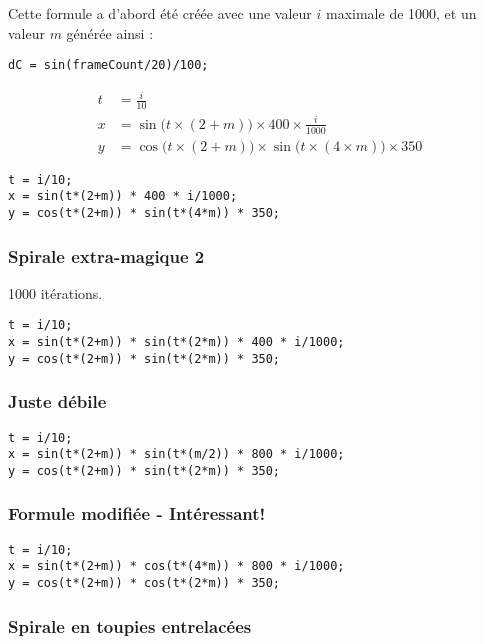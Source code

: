 Cette formule a d'abord été créée avec une valeur $i$ maximale de 1000, et un valeur $m$ générée ainsi :

\begin{lstlisting}
dC = sin(frameCount/20)/100;
\end{lstlisting}

\begin{align*}
t &= \frac{i}{10}\\
x &= \sin\big(t \times (2+m)\big) \times 400 \times \frac{i}{1000}\\
y &= \cos\big(t \times (2+m)\big) \times \sin\big(t\times (4\times m)\big) \times 350
\end{align*}

\begin{lstlisting}
t = i/10;
x = sin(t*(2+m)) * 400 * i/1000;
y = cos(t*(2+m)) * sin(t*(4*m)) * 350;
\end{lstlisting}

\subsubsection{Spirale extra-magique 2}1000 itérations.

\begin{lstlisting}
t = i/10;
x = sin(t*(2+m)) * sin(t*(2*m)) * 400 * i/1000;
y = cos(t*(2+m)) * sin(t*(2*m)) * 350;
\end{lstlisting}

\subsubsection{Juste débile}

\begin{lstlisting}
t = i/10;
x = sin(t*(2+m)) * sin(t*(m/2)) * 800 * i/1000;
y = cos(t*(2+m)) * sin(t*(2*m)) * 350;
\end{lstlisting}

\subsubsection{Formule modifiée - Intéressant!}

\begin{lstlisting}
t = i/10;
x = sin(t*(2+m)) * cos(t*(4*m)) * 800 * i/1000;
y = cos(t*(2+m)) * cos(t*(2*m)) * 350;
\end{lstlisting}

\subsubsection{Spirale en toupies entrelacées}

